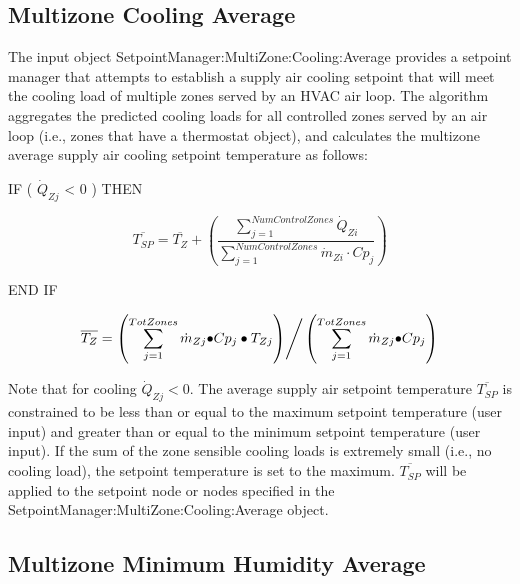 \subsection{Multizone Cooling Average}\label{multizone-cooling-average}

The input object SetpointManager:MultiZone:Cooling:Average provides a setpoint manager that attempts to establish a supply air cooling setpoint that will meet the cooling load of multiple zones served by an HVAC air loop. The algorithm aggregates the predicted cooling loads for all controlled zones served by an air loop (i.e., zones that have a thermostat object), and calculates the multizone average supply air cooling setpoint temperature as follows:

IF ( \({\dot Q_{Zj}}\) \textless{} 0 ) THEN

\begin{equation}
\overline {{T_{SP}}}  = \overline {{T_Z}}  + \left( {\frac{{\sum\limits_{j = 1}^{NumControlZones} {{{\dot Q}_{Zi}}} }}{{\sum\limits_{j = 1}^{NumControlZones} {{{\dot m}_{Zi}}\cdot C{p_j}} }}} \right)
\end{equation}

END IF

\begin{equation}
{\overline{T_Z}} = {{\left( {\sum\limits_{j = 1}^{TotZones} {{{\dot m}_{Zj}} \bullet } C{p_j} \bullet {T_{Zj}}} \right)} \mathord{\left/ {\vphantom {{\left( {\sum\limits_{j = 1}^{TotZones} {{{\dot m}_{Zj}} \bullet } C{p_j} \bullet {T_{Zj}}} \right)} {\left( {\sum\limits_{j = 1}^{TotZones} {{{\dot m}_{Zj}} \bullet } C{p_j}} \right)}}} \right. } {\left( {\sum\limits_{j = 1}^{TotZones} {{{\dot m}_{Zj}} \bullet } C{p_j}} \right)}}
\end{equation}

Note that for cooling \({\dot Q_{Zj}} < 0.\) The average supply air setpoint temperature \({\overline{T_{SP}}}\) is constrained to be less than or equal to the maximum setpoint temperature (user input) and greater than or equal to the minimum setpoint temperature (user input). If the sum of the zone sensible cooling loads is extremely small (i.e., no cooling load), the setpoint temperature is set to the maximum. \({\overline{T_{SP}}}\) will be applied to the setpoint node or nodes specified in the SetpointManager:MultiZone:Cooling:Average object.

\subsection{Multizone Minimum Humidity Average}\label{multizone-minimum-humidity-average}

